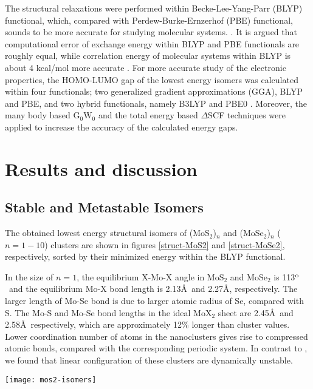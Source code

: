 \documentclass[nofootinbib,10pt,aip,twocolumn,showpacs]{revtex4-1}
\begin{document}
The structural relaxations were performed within Becke-Lee-Yang-Parr (BLYP)\cite{becke1988multicenter, lee1988development} functional,
which, compared with Perdew-Burke-Ernzerhof (PBE) functional, 
sounds to be more accurate for studying molecular systems.
\cite{martin2004,koch2015chemist}.
It is argued that computational error of exchange energy 
within BLYP and PBE functionals are roughly equal,
while correlation energy of molecular systems 
within BLYP is about 4 kcal/mol more accurate
\cite{kurth1999molecular}. 
For more accurate study of the electronic properties, 
the HOMO-LUMO gap of the lowest energy isomers was calculated within four functionals; 
two generalized gradient approximations (GGA), BLYP and PBE,
and two hybrid functionals, namely B3LYP \cite{becne1993densityddotnufunctional} and PBE0 \cite{ernzerhof1999assessment, adamo1999toward}.
Moreover, the many body based G$_0$W$_0$ and the total energy based $\Delta$SCF 
techniques were applied to increase the accuracy of the calculated energy gaps.


\section{Results and discussion}
\label{sec:results}
\subsection{Stable and Metastable Isomers}  

The obtained lowest energy structural isomers of (MoS$_2$)$_n$ and 
(MoSe$_2$)$_n$ ($n=1-10$) clusters are shown in figures \ref{struct-MoS2} 
and \ref{struct-MoSe2}, respectively, sorted by their minimized energy 
within the BLYP functional.

In the size of $n=1$, the equilibrium X-Mo-X angle in MoS$_2$ and MoSe$_2$ 
is 113$^{\rm o}$\ and the equilibrium Mo-X bond length is 2.13\AA\ and 2.27\AA, respectively.
The larger length of Mo-Se bond is due to larger atomic radius of Se, compared with S.
The Mo-S and Mo-Se bond lengths in the ideal MoX$_2$ sheet are 2.45\AA\ and 2.58\AA\, respectively, 
which are approximately 12\% longer than cluster values.
Lower coordination number of atoms in the nanoclusters gives rise to compressed atomic
bonds, compared with the corresponding periodic system.
In contrast to \textcite{murugan2005a},
we found that linear configuration of these clusters are dynamically unstable.


\begin{figure*}
\texttt{[image: mos2-isomers]}
\caption{\label{struct-MoS2}
 Stable and metastable structures of (MoS$_2$)$_n$ ($n=1-10$) nanoclusters.
 The small yellow (large blue) balls stand for S (Mo) atoms.
 The point groups, written in the parentheses, 
 are determined by using MacMolPlt software \cite{bode1998macmolplt}.
 Obtained Root Mean Square Deviation (RMSD) of molybdenum atoms
 from a perfect flat plane is written in the second parenthesis.
}
\end{figure*}
\end{document}
